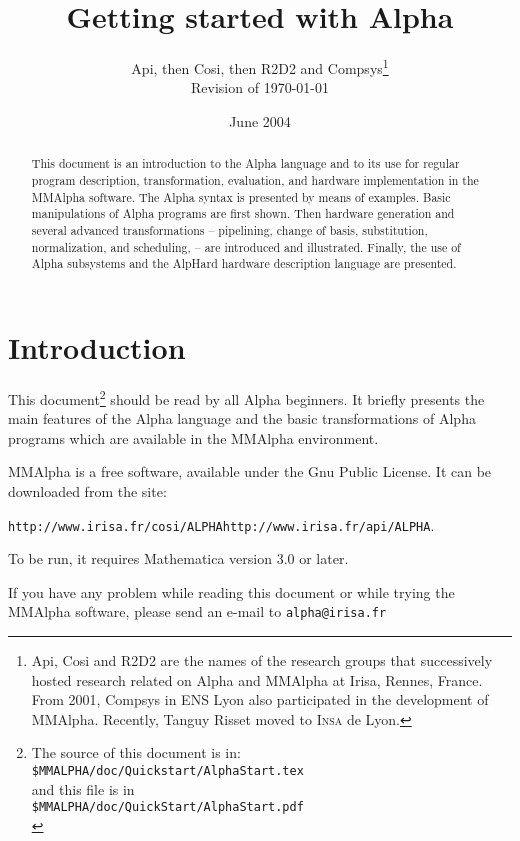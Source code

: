 \documentclass[12pt]{article}
\makeatletter
\newcommand{\gpl}{Gnu Public License}
\newcommand{\sitemmalfa}
{\texttt{{http://www.irisa.fr/cosi/ALPHA}{http://www.irisa.fr/api/ALPHA}}}
\newcommand{\emailmmalfa}{\texttt{alpha@irisa.fr}}
\newcommand{\Alpha}{{\sc Alpha}}
\newcommand{\AlpHard}{{\sc AlpHard}}
\newcommand{\MMA}{{\sc MMAlpha}}
\newcommand{\alfa}{\Alpha}
\newcommand{\mmalfa}{\MMA}
\newcommand{\mmalpha}{\MMA}
\newcommand{\mma}{{Mathematica}}
\makeatother
\begin{document}
\title{Getting started with \Alpha{}}
\author{Api, then Cosi, then R2D2 and Compsys\thanks{
Api, Cosi and R2D2 are the names of the 
research groups that successively hosted
research related on \alfa{} and \mmalpha{} at Irisa, Rennes, France. 
From 2001, Compsys in ENS Lyon also participated in 
the development of \mmalpha{}. Recently, Tanguy Risset moved to \textsc{Insa} de Lyon.}
\\Revision of \today{}}
\date{June 2004}
\maketitle

\begin{abstract}
This document is an introduction to the \alfa{} language
and to its use for regular program description, transformation, 
evaluation, and hardware implementation in the \mmalfa{} 
software. The \alfa{} syntax is presented by means of examples. 
Basic manipulations of \alfa{} programs are first shown. 
Then hardware generation and 
several advanced 
transformations -- pipelining, change of basis, substitution, 
normalization, and 
scheduling, -- are introduced and illustrated. 
Finally, the use of \alfa{} subsystems and the \AlpHard{}
hardware description language are presented.
\end{abstract}

\section{Introduction}
\label{intro}
This document\footnote{The source of this document is in:\\
\texttt{\$MMALPHA/doc/Quickstart/AlphaStart.tex}\\
and this file is in\\
\texttt{\$MMALPHA/doc/QuickStart/AlphaStart.pdf}\\
} should be read by all \alfa{} beginners.
It briefly presents the main features of the \alfa{} language and
the basic transformations of \alfa{} programs which are 
available in the \mmalfa{} environment.

\mmalfa{} is a free software, available under the 
\gpl{}. It can be downloaded from 
the site: 

\sitemmalfa{}. 

To be run, it requires
\mma{} version 3.0 or later.

If you have any problem while reading this document or while 
trying the
\mmalfa{} software, please send an e-mail to \emailmmalfa{}
\end{document}
